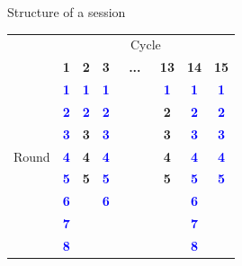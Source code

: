 \documentclass{beamer}
\begin{document}
\begin{frame}{Structure of a session}
\begin{card}
\begin{center}
\begin{tabular}{c|c|c|c|ccc|c|c|c|}
\multicolumn{1}{c}{} & \multicolumn{9}{c}{Cycle}\\ 
\multirow{14}{*}{\begin{turn}{90}
Round
\end{turn}} & \textbf{\tiny{}1} & \textbf{\tiny{}2} & \textbf{\tiny{}3} & \multicolumn{3}{c|}{\textbf{\tiny{}...}} & \textbf{\tiny{}13} & \textbf{\tiny{}14} & \textbf{\tiny{}15}\\ 
\cline{2-10}
 & \textbf{\textcolor{blue}{\tiny{}1}} & \textbf{\textcolor{blue}{\tiny{}1}} & \textbf{\textcolor{blue}{\tiny{}1}} &  &  &  & \textbf{\textcolor{blue}{\tiny{}1}} & \textbf{\textcolor{blue}{\tiny{}1}} & \textbf{\textcolor{blue}{\tiny{}1}}\\ 
 & \textbf{\textcolor{blue}{\tiny{}2}} & \textbf{\textcolor{blue}{\tiny{}2}} & \textbf{\textcolor{blue}{\tiny{}2}} &  &  &  & \textbf{\tiny{}2} & \textbf{\textcolor{blue}{\tiny{}2}} & \textbf{\textcolor{blue}{\tiny{}2}}\\ 
 & \textbf{\textcolor{blue}{\tiny{}3}} & \textbf{\tiny{}3} & \textbf{\textcolor{blue}{\tiny{}3}} &  &  &  & \textbf{\tiny{}3} & \textbf{\textcolor{blue}{\tiny{}3}} & \textbf{\textcolor{blue}{\tiny{}3}}\\ 
 & \textbf{\textcolor{blue}{\tiny{}4}} & \textbf{\tiny{}4} & \textbf{\textcolor{blue}{\tiny{}4}} &  &  &  & \textbf{\tiny{}4} & \textbf{\textcolor{blue}{\tiny{}4}} & \textbf{\textcolor{blue}{\tiny{}4}}\\ 
 & \textbf{\textcolor{blue}{\tiny{}5}} & \textbf{\tiny{}5} & \textbf{\textcolor{blue}{\tiny{}5}} &  &  &  & \textbf{\tiny{}5} & \textbf{\textcolor{blue}{\tiny{}5}} & \textbf{\textcolor{blue}{\tiny{}5}}\\ 
 & \textbf{\textcolor{blue}{\tiny{}6}} &  & \textbf{\textcolor{blue}{\tiny{}6}} &  &  &  &  & \textbf{\textcolor{blue}{\tiny{}6}} & \\ 
 & \textbf{\textcolor{blue}{\tiny{}7}} &  &  &  &  &  &  & \textbf{\textcolor{blue}{\tiny{}7}} & \\ 
 & \textbf{\textcolor{blue}{\tiny{}8}} &  &  &  &  &  &  & \textbf{\textcolor{blue}{\tiny{}8}} & \\ 
\end{tabular}
\end{center}
\end{card}
\end{frame}
\end{document}
